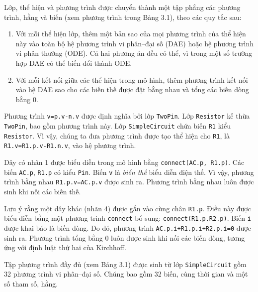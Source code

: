 Lớp, thể hiện và phương trình được chuyển thành một tập phẳng các phương trình, hằng và biến (xem phương trình trong Bảng 3.1), theo các quy tắc sau:
\begin{enumerate}
\item Với mỗi thể hiện lớp, thêm một bản sao của mọi phương trình của thể hiện này vào toàn bộ hệ phương trình vi phân--đại số (DAE) hoặc hệ phương trình vi phân thường (ODE). Cả hai phương án đều có thể, vì trong một số trường hợp DAE có thể biến đổi thành ODE.
\item Với mỗi kết nối giữa các thể hiện trong mô hình, thêm phương trình kết nối vào hệ DAE sao cho các biến thế được đặt bằng nhau và tổng các biến dòng bằng 0.
\end{enumerate}
Phương trình \texttt{v=p.v-n.v} được định nghĩa bởi lớp \texttt{TwoPin}. Lớp \texttt{Resistor} kế thừa \texttt{TwoPin}, bao gồm phương trình này. Lớp \texttt{SimpleCircuit} chứa biến \texttt{R1} kiểu \texttt{Resistor}. Vì vậy, chúng ta đưa phương trình được tạo thể hiện cho \texttt{R1}, là \texttt{R1.v=R1.p.v-R1.n.v}, vào hệ phương trình.

Dây có nhãn 1 được biểu diễn trong mô hình bằng \texttt{connect(AC.p, R1.p)}. Các biến \texttt{AC.p}, \texttt{R1.p} có kiểu \texttt{Pin}. Biến \texttt{v} là \emph{biến thế} biểu diễn điện thế. Vì vậy, phương trình bằng nhau \texttt{R1.p.v=AC.p.v} được sinh ra. Phương trình bằng nhau luôn được sinh khi nối các biến thế.

Lưu ý rằng một dây khác (nhãn 4) được gắn vào cùng chân \texttt{R1.p}. Điều này được biểu diễn bằng một phương trình \texttt{connect} bổ sung: \texttt{connect(R1.p.R2.p)}. Biến \texttt{i} được khai báo là biến dòng. Do đó, phương trình \texttt{AC.p.i+R1.p.i+R2.p.i=0} được sinh ra. Phương trình tổng bằng 0 luôn được sinh khi nối các biến dòng, tương ứng với định luật thứ hai của Kirchhoff.

Tập phương trình đầy đủ (xem Bảng 3.1) được sinh từ lớp \texttt{SimpleCircuit} gồm 32 phương trình vi phân--đại số. Chúng bao gồm 32 biến, cùng thời gian và một số tham số, hằng.

